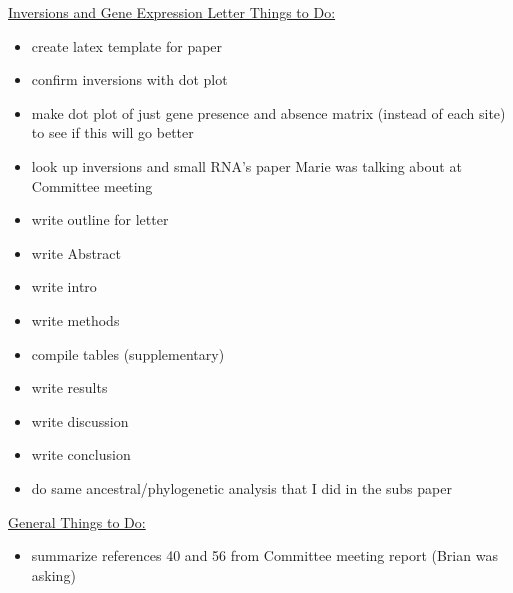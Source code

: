\documentclass[12pt]{article}
\newcommand{\p}{progressiveMauve\xspace}
\newcommand{\ecoli}{\textit{Escherichia coli}\xspace}
\begin{document}
\underline{Inversions and Gene Expression Letter Things to Do:}
\begin{itemize}
%	
%	
%	
%	
%	
	\item create latex template for paper

	\item confirm inversions with dot plot
	\item make dot plot of just gene presence and absence matrix (instead of each site) to see if this will go better
	\item look up inversions and small RNA's paper Marie was talking about at Committee meeting
	\item write outline for letter
	\item write Abstract
	\item write intro
	\item write methods
	\item compile tables (supplementary)
	\item write results
	\item write discussion
	\item write conclusion 
	\item do same ancestral/phylogenetic analysis that I did in the subs paper 
\end{itemize}

\underline{General Things to Do:}
\begin{itemize}
	\item summarize references 40 and 56 from Committee meeting report (Brian was asking)
	
	
\end{itemize}


\end{document}
